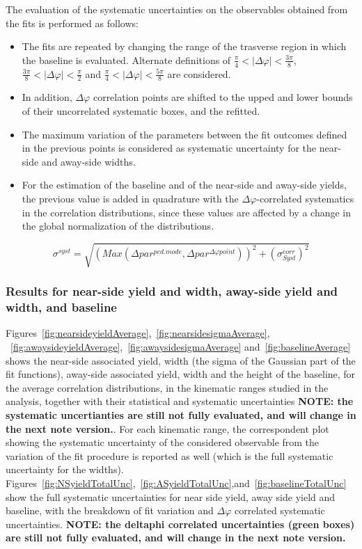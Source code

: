 The evaluation of the systematic uncertainties on the observables obtained from the fits is performed as follows:

\begin{itemize}
\item The fits are repeated by changing the range of the trasverse region in which the baseline is evaluated. Alternate definitions of $\frac{\pi}{4}<|\Delta\varphi|<\frac{3\pi}{8}$, $\frac{3\pi}{8}<|\Delta\varphi|<\frac{\pi}{2}$ and $\frac{\pi}{4}<|\Delta\varphi|<\frac{5\pi}{8}$ are considered.
\item In addition, $\Delta\varphi$ correlation points are shifted to the upped and lower bounds of their uncorrelated systematic boxes, and the refitted.
\item The maximum variation of the parameters between the fit outcomes defined in the previous points is considered as systematic uncertainty for the near-side and away-side widths.
\item For the estimation of the baseline and of the near-side and away-side yields, the previous value is added in quadrature with the $\Delta\varphi$-correlated systematics in the correlation distributions, since these values are affected by a change in the global normalization of the distributions.
\end{itemize}

\begin{equation}
\sigma^{syst} = \sqrt{\left(Max\left(\Delta par^{ped.mode},\Delta par^{\Delta\varphi point}\right)\right)^{2} + (\sigma_{Syst}^{corr})^{2}}
\end{equation}

\subsubsection{Results for near-side yield and width, away-side yield and width, and baseline}

Figures~\ref{fig:nearsideyieldAverage},~\ref{fig:nearsidesigmaAverage}, ~\ref{fig:awaysideyieldAverage},~\ref{fig:awaysidesigmaAverage} and~\ref{fig:baselineAverage} shows the near-side associated yield, width (the sigma of the Gaussian part of the fit functions), away-side associated yield, width and the height of the baseline, for the average correlation distributions, in the kinematic ranges studied in the analysis, together with their statistical and systematic uncertainties {\bf NOTE: the systematic uncertianties are still not fully evaluated, and will change in the next note version.}. For each kinematic range, the correspondent plot showing the systematic uncertainty of the considered observable from the variation of the fit procedure is reported as well (which is the full systematic uncertainty for the widths).
Figures~\ref{fig:NSyieldTotalUnc},~\ref{fig:ASyieldTotalUnc},and~\ref{fig:baselineTotalUnc} show the full systematic uncertainties for near side yield, away side yield and baseline, with the breakdown of fit variation and $\Delta\varphi$ correlated systematic uncertainties. {\bf NOTE: the deltaphi correlated uncertainties (green boxes) are still not fully evaluated, and will change in the next note version.}

